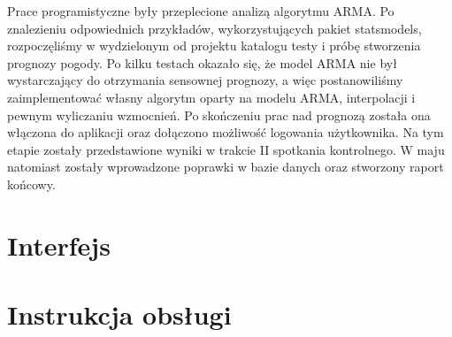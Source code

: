 \documentclass[a4paper]{article}
\begin{document}
\newline
Prace programistyczne były przeplecione analizą algorytmu ARMA. Po znalezieniu odpowiednich przykładów, wykorzystujących pakiet statsmodels, rozpoczęliśmy w wydzielonym od projektu katalogu testy i próbę stworzenia prognozy pogody. Po kilku testach okazało się, że model ARMA nie był wystarczający do otrzymania sensownej prognozy, a więc postanowiliśmy zaimplementować własny algorytm oparty na modelu ARMA, interpolacji i pewnym wyliczaniu wzmocnień.
\newline
Po skończeniu prac nad prognozą została ona włączona do aplikacji oraz dołączono możliwość logowania użytkownika.
\newline
Na tym etapie zostały przedstawione wyniki w trakcie II spotkania kontrolnego. 
W maju natomiast zostały wprowadzone poprawki w bazie danych oraz stworzony raport końcowy.

\section{Interfejs}


\section{Instrukcja obsługi}

\end{document}
